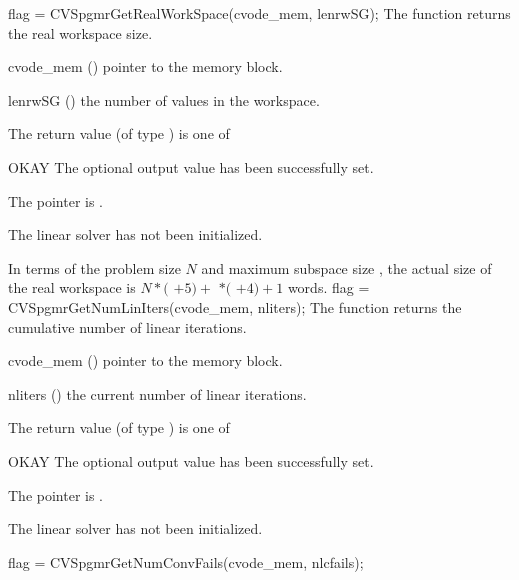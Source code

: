 {}
{
  flag = CVSpgmrGetRealWorkSpace(cvode\_mem, lenrwSG);
}
{
  The function  returns the
  {\cvspgmr} real workspace size.
}
{
  \begin{args}
  \item[cvode\_mem] ()
    pointer to the {\cvode} memory block.
  \item[lenrwSG] ()
    the number of  values in the {\cvspgmr} workspace.
  \end{args}
}
{
  The return value  (of type ) is one of
  \begin{args}
  \item[OKAY] 
    The optional output value has been successfully set.
  \item[\Id{LIN\_NO\_MEM}]
    The  pointer is .
  \item[\Id{LIN\_NO\_LMEM}]
    The {\cvspgmr} linear solver has not been initialized.
  \end{args}
}
{
  In terms of the problem size $N$ and maximum subspace size , 
  the actual size of the real workspace is
  $N*($  $+ 5) +$  $*($  $ + 4) + 1$  words.
}
{
  flag = CVSpgmrGetNumLinIters(cvode\_mem, nliters);
}
{
  The function  returns the
  cumulative number of linear iterations.
}
{
  \begin{args}
  \item[cvode\_mem] ()
    pointer to the {\cvode} memory block.
  \item[nliters] ()
    the current number of linear iterations.
  \end{args}
}
{
  The return value  (of type ) is one of
  \begin{args}
  \item[OKAY] 
    The optional output value has been successfully set.
  \item[\Id{LIN\_NO\_MEM}]
    The  pointer is .
  \item[\Id{LIN\_NO\_LMEM}]
    The {\cvspgmr} linear solver has not been initialized.
  \end{args}
}
{}
{
  flag = CVSpgmrGetNumConvFails(cvode\_mem, nlcfails);
}
